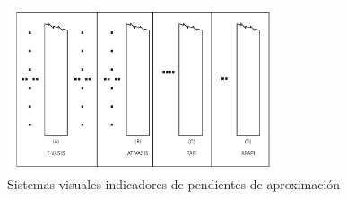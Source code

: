 \begin{figure}[!htb]
  \centering
  \includegraphics[width=0.7\textwidth]{06.radionavegacion/Imagenes/06.VASIS/06-TVasis+AT-Vasis+Papi+Apapi.pdf}
  \caption{ Sistemas visuales indicadores de pendientes de aproximación \protect\cite{Anexo14Vol1}}
  \label{fig:06.sistemas.indicadores.pendiente.aproximacion}
\end{figure}

